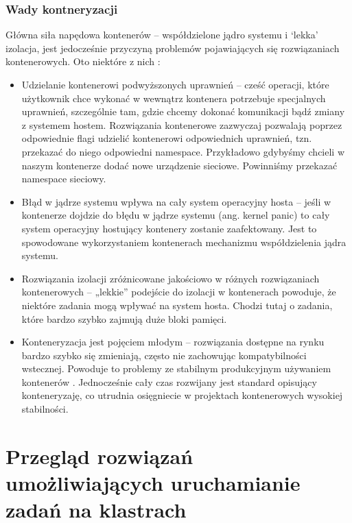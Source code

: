 \documentclass[10pt,a4paper,titlepage,twoside]{report}
\begin{document}
\subsection{Wady kontneryzacji}\indent \indent Główna siła napędowa kontenerów – współdzielone jądro systemu i ‘lekka’ izolacja, jest jedocześnie przyczyną problemów pojawiających się rozwiązaniach kontenerowych. Oto niektóre z nich \cite{ad25}:

\begin{itemize}
	\item Udzielanie kontenerowi podwyższonych uprawnień – cześć operacji, które użytkownik chce wykonać w wewnątrz kontenera potrzebuje specjalnych uprawnień, szczególnie tam, gdzie chcemy dokonać komunikacji bądź zmiany z systemem hostem. Rozwiązania kontenerowe zazwyczaj pozwalają poprzez odpowiednie flagi udzielić kontenerowi odpowiednich uprawnień, tzn. przekazać do niego odpowiedni namespace. Przykładowo gdybyśmy chcieli w naszym kontenerze dodać nowe urządzenie sieciowe. Powinniśmy przekazać namespace sieciowy.
	\item Błąd w jądrze systemu wpływa na cały system operacyjny hosta – jeśli w kontenerze dojdzie do błędu w jądrze systemu (ang. kernel panic) to cały system operacyjny hostujący kontenery zostanie zaafektowany. Jest to spowodowane wykorzystaniem kontenerach mechanizmu współdzielenia jądra systemu.
	\item Rozwiązania izolacji zróżnicowane jakościowo w różnych rozwiązaniach kontenerowych – „lekkie” podejście do izolacji w kontenerach powoduje, że niektóre zadania mogą wpływać na system hosta. Chodzi tutaj o zadania, które bardzo szybko zajmują duże bloki pamięci.
	\item Konteneryzacja jest pojęciem młodym – rozwiązania dostępne na rynku bardzo szybko się zmieniają, często nie zachowując kompatybilności wstecznej. Powoduje to problemy ze stabilnym produkcyjnym używaniem kontenerów \cite{ad25}. Jednocześnie cały czas rozwijany jest standard opisujący konteneryzaję, co utrudnia osięgniecie w projektach kontenerowych wysokiej stabilności.
\end{itemize}

\newpage

\onehalfspacing
\chapter{Przegląd rozwiązań umożliwiających uruchamianie zadań na klastrach}
\end{document}
